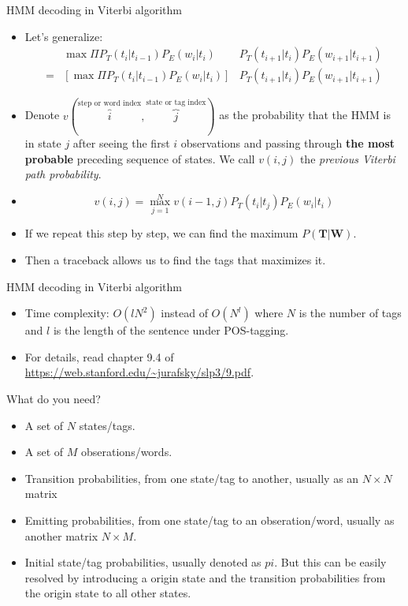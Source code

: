 \documentclass[11pt, handout]{beamer}
\newcommand{\argmaxF}{\mathop{\mathrm{argmax}}\limits}
\begin{document}
\begin{frame}{HMM decoding in Viterbi algorithm}
\begin{itemize}[<+->]
 \item Let's generalize: 
 \begin{align*}
  &  \max \Pi P_T(t_i|t_{i-1}) P_E(w_i| t_i) & P_T(t_{i+1}|t_i) P_E(w_{i+1}| t_{i+1}) \\
  = &  \left [  \max \Pi P_T(t_i|t_{i-1}) P_E(w_i| t_i) \right ] & P_T(t_{i+1}|t_i) P_E(w_{i+1}| t_{i+1})
  \end{align*}
 \item Denote $v(\overbrace{i}^{\text{step or word index}}, \overbrace{j}^{\text{state or tag index}})$ as the probability that the HMM is in state $j$ after seeing the first $i$ observations and passing through \textbf{the most probable} preceding sequence of states. We call $v(i,j)$ the \emph{previous Viterbi path probability}. 
 \item 
 $$
 v(i,j) = \max_{j=1}^N v(i-1, j)P_T(t_i|t_j) P_E(w_i|t_i)
 $$
 \item If we repeat this step by step, we can find the maximum $P(\mathbf{T}|\mathbf{W})$. 
 \item Then a traceback allows us to find the tags that maximizes it.
 \end{itemize} 
\end{frame}

\begin{frame}{HMM decoding in Viterbi algorithm}
 \begin{itemize}
  \item Time complexity: $O(lN^2)$ instead of $O(N^l)$ where $N$ is the number of tags and $l$ is the length of the sentence under  POS-tagging. 
  \item For details, read chapter 9.4 of \url{https://web.stanford.edu/~jurafsky/slp3/9.pdf}.
 \end{itemize}
\end{frame}

\begin{frame}{What do you need?}
  \begin{itemize}[<+->]
    \item A set of $N$ states/tags. 
    \item A set of $M$ obserations/words.
    \item Transition probabilities, from one state/tag to another, usually as an $N\times N$ matrix
    \item Emitting probabilities, from one state/tag to an obseration/word, usually as another matrix $N\times M$. 
    \item Initial state/tag probabilities, usually denoted as $pi$. But this can be easily resolved by introducing a origin state and the transition probabilities from the origin state to all other states. 
  \end{itemize}
\end{frame}  
\end{document}
